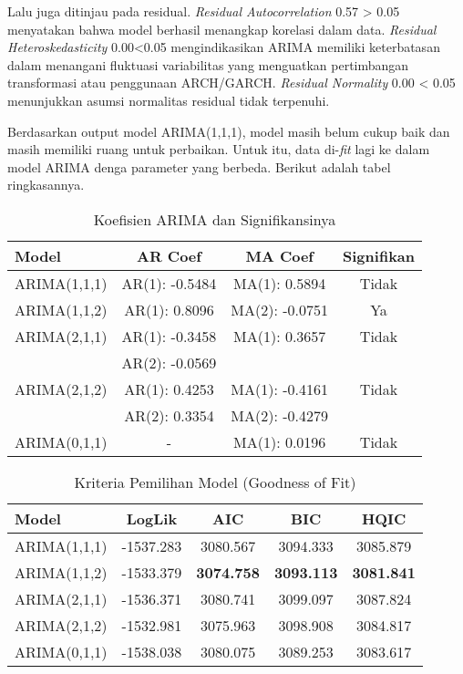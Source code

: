 \documentclass[a4paper,12pt]{article}
\begin{document}
Lalu juga ditinjau pada residual. \textit{Residual Autocorrelation} 0.57 > 0.05 menyatakan bahwa model berhasil menangkap korelasi dalam data. \textit{Residual Heteroskedasticity} 0.00<0.05 mengindikasikan ARIMA memiliki keterbatasan dalam menangani fluktuasi variabilitas yang menguatkan pertimbangan transformasi atau penggunaan ARCH/GARCH. \textit{Residual Normality} 0.00 < 0.05 menunjukkan asumsi normalitas residual tidak terpenuhi.

Berdasarkan output model ARIMA(1,1,1), model masih belum cukup baik dan masih memiliki ruang untuk perbaikan. Untuk itu, data di-\textit{fit} lagi ke dalam model ARIMA denga parameter yang berbeda. Berikut adalah tabel ringkasannya.

\begin{table}[h!]
\centering
\begin{tabular}{lccc}
\toprule
\textbf{Model} & \textbf{AR Coef} & \textbf{MA Coef} & \textbf{Signifikan} \\
\midrule
ARIMA(1,1,1) & AR(1): -0.5484 & MA(1): 0.5894 & Tidak \\
\midrule
ARIMA(1,1,2) & AR(1): 0.8096 & MA(2): -0.0751 & Ya \\
\midrule
ARIMA(2,1,1) & AR(1): -0.3458  & MA(1): 0.3657 & Tidak \\
& AR(2): -0.0569 &  &\\
\midrule
ARIMA(2,1,2) & AR(1): 0.4253 & MA(1): -0.4161 & Tidak \\
& AR(2): 0.3354 & MA(2): -0.4279 &\\
\midrule
ARIMA(0,1,1) & - & MA(1): 0.0196 & Tidak \\
\bottomrule
\end{tabular}
\caption{Koefisien ARIMA dan Signifikansinya}
\end{table}

\vspace{0.5cm}

\begin{table}[h!]
\centering
\begin{tabular}{lcccc}
\toprule
\textbf{Model} & \textbf{LogLik} & \textbf{AIC} & \textbf{BIC} & \textbf{HQIC} \\
\midrule
ARIMA(1,1,1) & -1537.283 & 3080.567 & 3094.333 & 3085.879 \\
ARIMA(1,1,2) & -1533.379 & \textbf{3074.758} & \textbf{3093.113} & \textbf{3081.841} \\
ARIMA(2,1,1) & -1536.371 & 3080.741 & 3099.097 & 3087.824 \\
ARIMA(2,1,2) & -1532.981 & 3075.963 & 3098.908 & 3084.817 \\
ARIMA(0,1,1) & -1538.038 & 3080.075 & 3089.253 & 3083.617 \\
\bottomrule
\end{tabular}
\caption{Kriteria Pemilihan Model (Goodness of Fit)}
\end{table}
\end{document}
